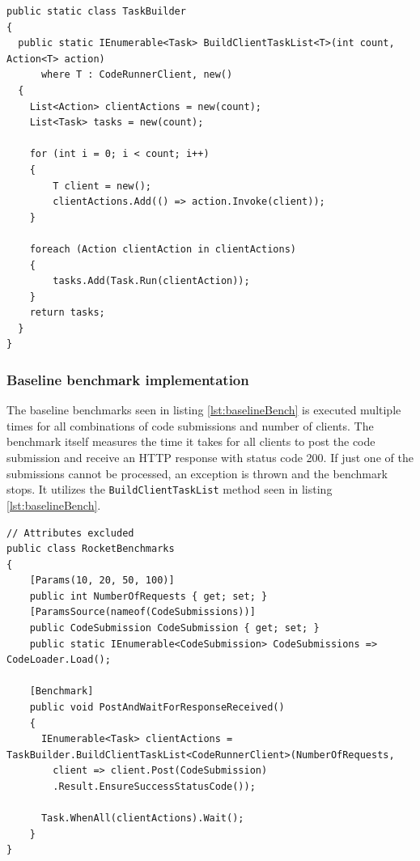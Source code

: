 \begin{lstlisting}[language=CSharp, escapechar=~, caption={C\# code showing the \texttt{BuildClientTaskList} method, which is used to build a number of actions which are executed simultaneously in a Task}, label={lst:TaskBuilder}]
public static class TaskBuilder
{
  public static IEnumerable<Task> BuildClientTaskList<T>(int count, Action<T> action)
      where T : CodeRunnerClient, new()
  {
    List<Action> clientActions = new(count);
    List<Task> tasks = new(count);
    
    for (int i = 0; i < count; i++)
    {
        T client = new();
        clientActions.Add(() => action.Invoke(client));
    }

    foreach (Action clientAction in clientActions)
    {
        tasks.Add(Task.Run(clientAction));
    }
    return tasks;
  }
}
\end{lstlisting}

\subsubsection{Baseline benchmark implementation}
The baseline benchmarks seen in listing \ref{lst:baselineBench} is executed multiple times for all combinations of code submissions and number of clients.
The benchmark itself measures the time it takes for all clients to post the code submission and receive an HTTP response with status code 200.
If just one of the submissions cannot be processed, an exception is thrown and the benchmark stops.
It utilizes the \texttt{BuildClientTaskList} method seen in listing \ref{lst:baselineBench}.
\begin{lstlisting}[language=CSharp, escapechar=~, caption={C\# code showing the benchmark implementation for the synchronous baseline}, label={lst:baselineBench}]
// Attributes excluded
public class RocketBenchmarks
{
    [Params(10, 20, 50, 100)] 
    public int NumberOfRequests { get; set; }
    [ParamsSource(nameof(CodeSubmissions))]
    public CodeSubmission CodeSubmission { get; set; }
    public static IEnumerable<CodeSubmission> CodeSubmissions => CodeLoader.Load();

    [Benchmark]
    public void PostAndWaitForResponseReceived()
    {
      IEnumerable<Task> clientActions = TaskBuilder.BuildClientTaskList<CodeRunnerClient>(NumberOfRequests,
        client => client.Post(CodeSubmission)
        .Result.EnsureSuccessStatusCode());
        
      Task.WhenAll(clientActions).Wait();
    }
}
\end{lstlisting}

